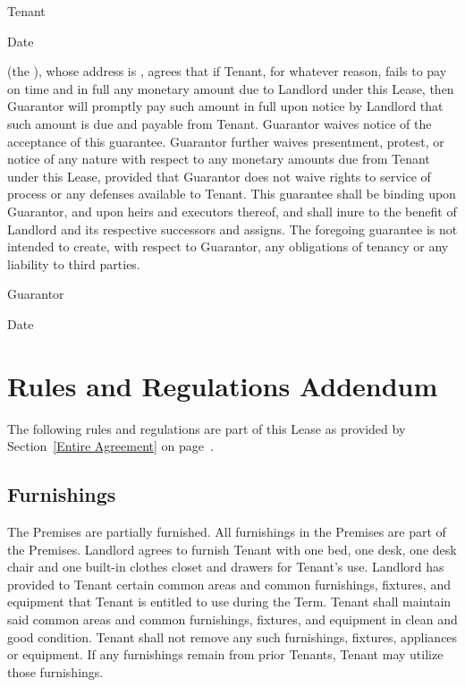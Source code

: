 \documentclass{article}
\begin{document}
\begin{signatureBlock}
  Tenant

  \signatureLine{}

  \tenantName\hfill Date
\end{signatureBlock}

\vfill

\emph{\guarantorName} (the ), whose address is
\emph{\guarantorAddress}, agrees that if Tenant, for whatever reason, fails to
pay on time and in full any monetary amount due to Landlord under this Lease,
then Guarantor will promptly pay such amount in full upon notice by Landlord
that such amount is due and payable from Tenant. Guarantor waives notice of the
acceptance of this guarantee. Guarantor further waives presentment, protest, or
notice of any nature with respect to any monetary amounts due from Tenant under
this Lease, provided that Guarantor does not waive rights to service of process
or any defenses available to Tenant. This guarantee shall be binding upon
Guarantor, and upon heirs and executors thereof, and shall inure to the benefit
of Landlord and its respective successors and assigns. The foregoing guarantee
is not intended to create, with respect to Guarantor, any obligations of tenancy
or any liability to third parties.

\begin{signatureBlock}
  Guarantor

  \signatureLine{}

  \guarantorName\hfill Date
\end{signatureBlock}

\clearpage %

\section*{Rules and Regulations Addendum}
\setcounter{subsection}{0}

The following rules and regulations are part of this Lease as provided by
Section~\ref{Entire Agreement} on page~\pageref{Entire Agreement}.

\subsection{Furnishings}
The Premises are partially furnished. All furnishings in the Premises are part
of the Premises. Landlord agrees to furnish Tenant with one bed, one desk, one
desk chair and one built-in clothes closet and drawers for Tenant’s use.
Landlord has provided to Tenant certain common areas and common furnishings,
fixtures, and equipment that Tenant is entitled to use during the Term. Tenant
shall maintain said common areas and common furnishings, fixtures, and equipment
in clean and good condition. Tenant shall not remove any such furnishings,
fixtures, appliances or equipment. If any furnishings remain from prior Tenants,
Tenant may utilize those furnishings.
\end{document}

